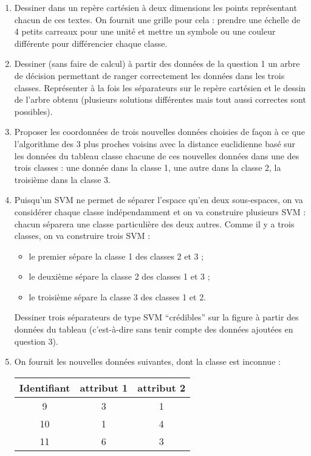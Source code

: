 \documentclass[a4paper, 11pt]{article}
\begin{document}
\begin{enumerate}
	\item Dessiner dans un repère cartésien à deux dimensions les points représentant chacun de ces
		textes. On fournit une grille pour cela : prendre une échelle de 4 petits carreaux pour une
		unité et mettre un symbole ou une couleur différente pour différencier chaque classe. 
	\item Dessiner (sans faire de calcul) à partir des données de la question 1 un arbre de décision
		permettant de ranger correctement les données dans les trois classes. Représenter à la fois les
		séparateurs sur le repère cartésien et le dessin de l'arbre obtenu (plusieurs solutions
		différentes mais tout aussi correctes sont possibles).
	\item Proposer les coordonnées de trois nouvelles données choisies de façon à ce que l'algorithme
		des 3 plus proches voisins avec la distance euclidienne basé sur les données du tableau classe
		chacune de ces nouvelles données dans une des trois classes : une donnée dans la classe 1, une
		autre dans la classe 2, la troisième dans la classe 3.
	\item Puisqu'un SVM ne permet de séparer l'espace qu'en deux sous-espaces, on va considérer chaque
		classe indépendamment et on va construire plusieurs SVM : chacun séparera une classe
		particulière des deux autres. Comme il y a trois classes, on va construire trois SVM :

		\begin{itemize}
			\item le premier sépare la classe 1 des classes 2 et 3 ;
			\item le deuxième sépare la classe 2 des classes 1 et 3 ;
			\item le troisième sépare la classe 3 des classes 1 et 2.
		\end{itemize}

		Dessiner trois séparateurs de type SVM ``crédibles'' sur la figure à partir des données du
		tableau (c'est-à-dire sans tenir compte des données ajoutées en question 3).
	\item On fournit les nouvelles données suivantes, dont la classe est inconnue :

		\begin{center}
			\begin{tabular}{|c|c|c|}
				\hline
				\textbf{Identifiant} & \textbf{attribut 1} & \textbf{attribut 2} \\
				\hline
				9 & 3 & 1 \\
				10 & 1 & 4 \\
				11 & 6 & 3 \\
				\hline
			\end{tabular}
		\end{center}


\end{enumerate}
\end{document}
